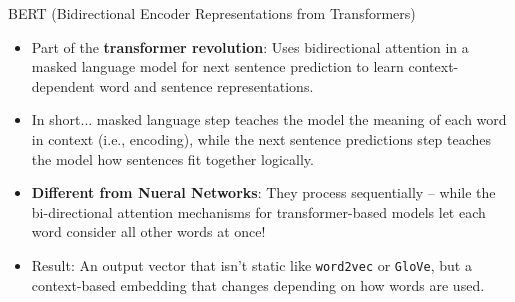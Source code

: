 \documentclass[
  ignorenonframetext,
  aspectratio=169]{beamer}
\begin{document}
\begin{frame}{BERT (Bidirectional Encoder Representations from
Transformers)}
\label{bert-bidirectional-encoder-representations-from-transformers}
\begin{itemize}
\item Part of the \textbf{transformer revolution}: Uses bidirectional attention in a masked language model for next sentence prediction to learn context-dependent word and sentence representations. \par \vspace{2.5mm} \pause
\item In short... masked language step teaches the model the meaning of each word in context (i.e., encoding), while the next sentence predictions step teaches the model how sentences fit together logically.  \par \vspace{2.5mm} \pause
\item \textbf{Different from Nueral Networks}: They process sequentially -- while the bi-directional attention mechanisms for transformer-based models let each word consider all other words at once!  \par \vspace{2.5mm}
\item Result: An output vector that isn’t static like \texttt{word2vec} or \texttt{GloVe}, but a context-based embedding that changes depending on how words are used.
\end{itemize}
\end{frame}
\end{document}
